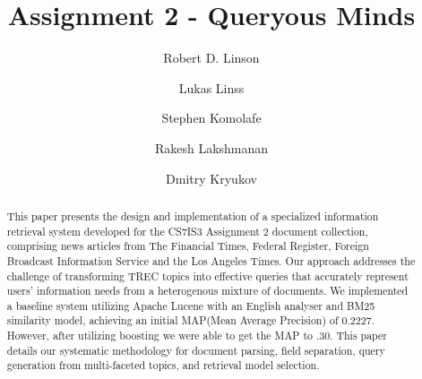 \documentclass[sigplan,screen,nonacm]{acmart}
\begin{document}
\title{Assignment 2 - Queryous Minds}

\author{Robert D. Linson}

\author{Lukas Linss}

\author{Stephen Komolafe}

\author{Rakesh Lakshmanan}

\author{Dmitry Kryukov}

\renewcommand{\shortauthors}{Trovato et al.}

\begin{abstract}
This paper presents the design and implementation of a specialized information retrieval system developed for the CS7IS3 Assignment 2 document collection, comprising news articles from The Financial Times, Federal Register, Foreign Broadcast Information Service and the Los Angeles Times. Our approach addresses the challenge of transforming TREC topics into effective queries that accurately represent users' information needs from a heterogenous mixture of documents. We implemented a baseline system utilizing Apache Lucene with an English analyser and BM25 similarity model, achieving an initial MAP(Mean Average Precision) of 0.2227. However, after utilizing boosting we were able to get the MAP to .30. This paper details our systematic methodology for document parsing, field separation, query generation from multi-faceted topics, and retrieval model selection.
\end{abstract}
\end{document}
